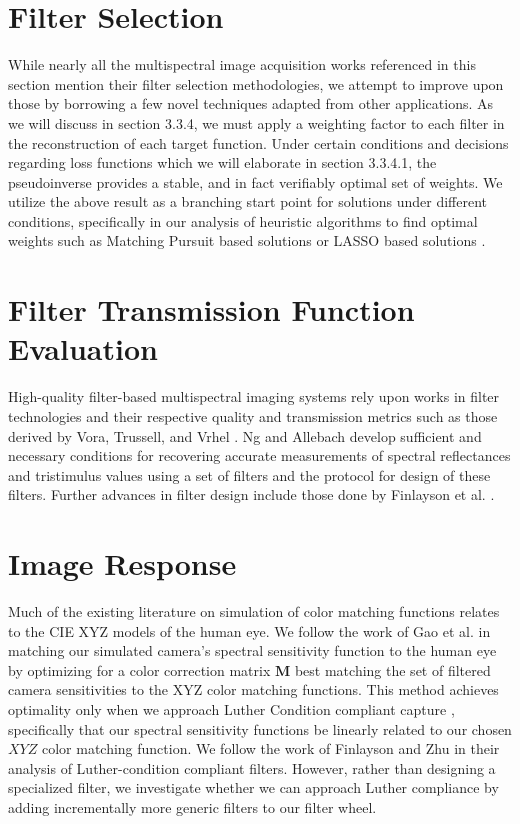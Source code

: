 \section{Filter Selection}
While nearly all the multispectral image acquisition works referenced in this section mention their filter selection methodologies, we attempt to improve upon those by borrowing a few novel techniques adapted from other applications. 
As we will discuss in section 3.3.4, we must apply a weighting factor to each filter in the reconstruction of each target function. 
Under certain conditions and decisions regarding loss functions which we will elaborate in section 3.3.4.1, the pseudoinverse \cite{greville1960some, BEUTLER1965451, macausland2014moore} provides a stable, and in fact verifiably optimal set of weights. 
We utilize the above result as a branching start point for solutions under different conditions, specifically in our analysis of heuristic algorithms to find optimal weights such as Matching Pursuit based solutions \cite{mallat1993matching} or LASSO based solutions \cite{LAKSHMI2025297, MEHTA20191}.

\section{Filter Transmission Function Evaluation}

High-quality filter-based multispectral imaging systems rely upon works in filter technologies and their respective quality and transmission metrics such as those derived by Vora, Trussell, and Vrhel \cite{vrhel1994filter,551700, vrhel1995design}.
Ng and Allebach \cite{1673444} develop sufficient and necessary conditions for recovering accurate measurements of spectral reflectances and tristimulus values using a set of filters and the protocol for design of these filters.
Further advances in filter design include those done by Finlayson et al. \cite{finlayson2020designing}.

\section{Image Response}
Much of the existing literature on simulation of color matching functions relates to the CIE XYZ models of the human eye. 
We follow the work of Gao et al. \cite{gao2024color} in matching our simulated camera's spectral sensitivity function to the human eye by optimizing for a color correction matrix $\boldsymbol{M}$ best matching the set of filtered camera sensitivities to the XYZ color matching functions. 
This method achieves optimality only when we approach Luther Condition compliant capture \cite{ives1915transformation}, specifically that our spectral sensitivity functions be linearly related to our chosen $XYZ$ color matching function. 
We follow the work of Finlayson and Zhu \cite{finlayson2020designing} in their analysis of Luther-condition compliant filters. 
However, rather than designing a specialized filter, we investigate whether we can approach Luther compliance by adding incrementally more generic filters to our filter wheel. 

